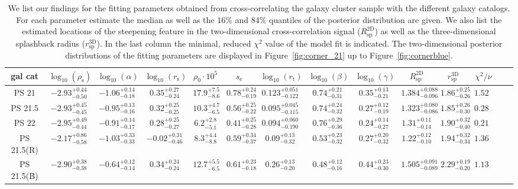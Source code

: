 \documentclass[iop, apjl, twocolappendix, numberedappendix]{emulateapj}
\begin{document}
\begin{table}
    \centering
    \caption{We list our findings for the fitting parameters obtained from cross-correlating the galaxy cluster sample with the different galaxy catalogs. For each parameter estimate the median as well as the 16\% and 84\% quantiles of the posterior distribution are given. We also list the estimated locations of the steepening feature in the two-dimensional cross-correlation signal ($R_{\mathrm{sp}}^{\mathrm{2D}}$) as well as the three-dimensional splashback radius ($r_{\mathrm{sp}}^{\mathrm{3D}}$). In the last column the minimal, reduced $\chi^2$ value of the model fit is indicated. The two-dimensional posterior distributions of the fitting parameters are displayed in 
Figure~\ref{fig:corner_21} up to Figure~\ref{fig:cornerblue}.}
    \label{tab:fit_parameters}
    \begin{tabular}{cccccccccccccc}
    \hline 
gal cat & $\log_{10}(\rho_{\mathrm{s}})$ & $\log_{10}(\alpha)$ & $\log_{10}(r_{\mathrm{s}})$ & $\rho_{\mathrm{0}}\cdot 10^{5}$ & $s_{\mathrm{e}}$ & $\log_{10}(r_{\mathrm{t}})$ & $\log_{10}(\beta)$ & $\log_{10}(\gamma)$ & $R_{\mathrm{sp}}^{\mathrm{2D}}$ & $r_{\mathrm{sp}}^{\mathrm{3D}}$ & $\chi^2/\nu$ \\
\hline 
\hline 
PS 21 & $-2.93_{-0.50}^{+0.44}$ & $-1.06_{-0.18}^{+0.14}$ & $0.35_{-0.24}^{+0.27}$ & $17.9_{-8.6}^{+7.5}$ & $0.78_{-0.19}^{+0.24}$ & $0.123_{-0.122}^{+0.051}$ & $0.74_{-0.31}^{+0.21}$ & $0.35_{-0.21}^{+0.13}$ & $1.384_{-0.096}^{+0.088}$ & $1.86_{-0.26}^{+0.25}$ & $1.524$ \\
\hline
PS 21.5 & $-2.93_{-0.45}^{+0.45}$ & $-0.95_{-0.16}^{+0.13}$ & $0.32_{-0.25}^{+0.25}$ & $10.3_{-6.5}^{+4.7}$ & $0.56_{-0.22}^{+0.25}$ & $0.095_{-0.115}^{+0.045}$ & $0.74_{-0.32}^{+0.24}$ & $0.27_{-0.19}^{+0.12}$ & $1.323_{-0.086}^{+0.080}$ & $1.85_{-0.30}^{+0.26}$ & $0.285$ \\
\hline
PS 22 & $-2.95_{-0.44}^{+0.49}$ & $-0.91_{-0.17}^{+0.14}$ & $0.28_{-0.27}^{+0.25}$ & $6.2_{-5.1}^{+2.8}$ & $0.41_{-0.28}^{+0.25}$ & $0.094_{-0.190}^{+0.060}$ & $0.76_{-0.36}^{+0.29}$ & $0.24_{-0.27}^{+0.14}$ & $1.31_{-0.14}^{+0.11}$ & $1.90_{-0.40}^{+0.32}$ & $0.211$ \\
\hline
PS 21.5(R) & $-2.17_{-0.58}^{+0.86}$ & $-1.03_{-0.33}^{+0.33}$ & $-0.02_{-0.46}^{+0.31}$ & $8.3_{-8.8}^{+4.4}$ & $0.59_{-0.37}^{+0.34}$ & $0.09_{-0.32}^{+0.13}$ & $0.53_{-0.32}^{+0.23}$ & $0.27_{-0.32}^{+0.20}$ & $1.22_{-0.10}^{+0.12}$ & $1.94_{-0.34}^{+0.32}$ & $1.361$ \\
\hline
PS 21.5(B) & $-2.90_{-0.38}^{+0.38}$ & $-0.64_{-0.14}^{+0.12}$ & $0.34_{-0.24}^{+0.24}$ & $12.7_{-6.5}^{+5.5}$ & $0.61_{-0.18}^{+0.23}$ & $0.26_{-0.20}^{+0.13}$ & $0.48_{-0.16}^{+0.12}$ & $0.44_{-0.30}^{+0.23}$ & $1.505_{-0.089}^{+0.091}$ & $2.29_{-0.20}^{+0.19}$ & $1.132$ \\
\hline
    \end{tabular} 
\end{table}
\end{document}
